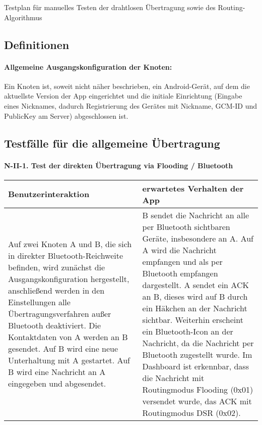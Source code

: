 Testplan für manuelles Testen der drahtlosen Übertragung sowie des
Routing-Algorithmus



\subsection{Definitionen}\label{i-definitionen}

\paragraph{Allgemeine Ausgangskonfiguration der
Knoten:}\label{allgemeine-ausgangskonfiguration-der-knoten}

Ein Knoten ist, soweit nicht näher beschrieben, ein Android-Gerät, auf
dem die aktuellste Version der App eingerichtet und die initiale
Einrichtung (Eingabe eines Nicknames, dadurch Registrierung des Gerätes
mit Nickname, GCM-ID und PublicKey am Server) abgeschlossen ist.



\clearpage
\subsection{Testfälle für die allgemeine
Übertragung}\label{ii-testfuxe4lle-fuxfcr-die-allgemeine-uxfcbertragung}

\paragraph{N-II-1. Test der direkten Übertragung via Flooding /
Bluetooth}\label{test-der-direkten-uxfcbertragung-via-flooding-bluetooth}

\begin{longtable}{p{8cm}p{8.5cm}}
\toprule
Benutzerinteraktion & erwartetes Verhalten der App\tabularnewline
\midrule
\endhead
Auf zwei Knoten A und B, die sich in direkter Bluetooth-Reichweite
befinden, wird zunächst die Ausgangskonfiguration hergestellt,
anschließend werden in den Einstellungen alle Übertragungsverfahren
außer Bluetooth deaktiviert. Die Kontaktdaten von A werden an B
gesendet. Auf B wird eine neue Unterhaltung mit A gestartet. Auf B wird
eine Nachricht an A eingegeben und abgesendet. & B sendet die Nachricht
an alle per Bluetooth sichtbaren Geräte, insbesondere an A. Auf A wird
die Nachricht empfangen und als per Bluetooth empfangen dargestellt. A
sendet ein ACK an B, dieses wird auf B durch ein Häkchen an der
Nachricht sichtbar. Weiterhin erscheint ein Bluetooth-Icon an der
Nachricht, da die Nachricht per Bluetooth zugestellt wurde. Im Dashboard
ist erkennbar, dass die Nachricht mit Routingmodus Flooding (0x01)
versendet wurde, das ACK mit Routingmodus DSR (0x02).\tabularnewline
\bottomrule
\end{longtable}

